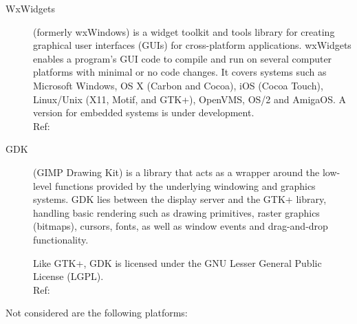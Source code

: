 \begin{description}
    \item[WxWidgets] (formerly wxWindows) is a widget toolkit and tools library
		for creating graphical user interfaces (GUIs) for cross-platform
		applications. wxWidgets enables a program's GUI code to compile
		and run on several computer platforms with minimal or no code
		changes. It covers systems such as Microsoft Windows, OS X
		(Carbon and Cocoa), iOS (Cocoa Touch), Linux/Unix (X11, Motif,
		and GTK+), OpenVMS, OS/2 and AmigaOS. A version for embedded
		systems is under development.
		\hspace*{\fill}\\Ref: \cite{wiki:wxwidget}
    \item[GDK]  (GIMP Drawing Kit) is a library that acts as a wrapper around
		the low-level functions provided by the underlying windowing
		and graphics systems. GDK lies between the display server and
		the GTK+ library, handling basic rendering such as drawing
		primitives, raster graphics (bitmaps), cursors, fonts, as well
		as window events and drag-and-drop functionality.

		Like GTK+, GDK is licensed under the GNU Lesser General
		Public License (LGPL).
		\hspace*{\fill}\\Ref: \cite{wiki:gdk}
\end{description}

Not considered are the following platforms:

